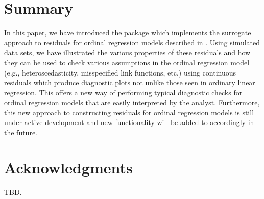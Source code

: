 \section{Summary}

In this paper, we have introduced the  package which implements the surrogate approach to residuals for ordinal regression models described in \citet{residuals-liu-2017}. Using simulated data sets, we have illustrated the various properties of these residuals and how they can be used to check various assumptions in the ordinal regression model (e.g., heteroscedasticity, misspecified link functions, etc.) using continuous residuals which produce diagnostic plots not unlike those seen in ordinary linear regression. This offers a new way of performing typical diagnostic checks for ordinal regression models that are easily interpreted by the analyst. Furthermore, this new approach to constructing residuals for ordinal regression models is still under active development and new functionality will be added to  accordingly in the future.



\section{Acknowledgments}

TBD.




\address{Brandon M. Greenwell\\
  Illumination Works\\
  6289 Commons Blvd\\
  Suite 120\\
  Beavercreek, OH 45431\\
  United States of America\\
  }

\address{Andrew McCarthy\\
  The Perduco Group\\
  3610 Pentagon Blvd\\
  Suite 110\\
  Beavercreek, OH 45431\\
  United States of America\\
  }

